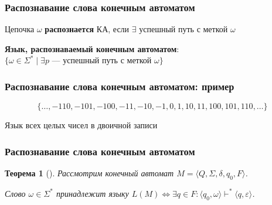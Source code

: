 \documentclass{beamer}
\newtheorem{rutheorem}{Теорема}
\def\iff{\Leftrightarrow}
\begin{document}
\begin{frame}[fragile]
  \transwipe[direction=90]
  \frametitle{Распознавание слова конечным автоматом}

\begin{center}
  Цепочка $\omega$ \textbf{распознается} КА, если $\exists$ успешный путь с меткой $\omega$
\end{center}

\vspace{20pt}

\begin{center}
  \textbf{Язык, распознаваемый конечным автоматом}: \\ $\{ \omega \in \Sigma^* \mid \exists p$ --- успешный путь с меткой $\omega \}$
\end{center}
\end{frame}

\begin{frame}[fragile]
  \transwipe[direction=90]
  \frametitle{Распознавание слова конечным автоматом: пример}

\[ \{ \dots, -110, -101, -100, -11, -10, -1, 0, 1, 10, 11, 100, 101, 110, \dots\} \]

\begin{center}
  Язык всех целых чисел в двоичной записи
\end{center}

  \begin{center}
  \end{center}
\end{frame}


\begin{frame}[fragile]
  \transwipe[direction=90]
  \frametitle{Распознавание слова конечным автоматом}
  \begin{rutheorem}[]
   Рассмотрим конечный автомат  $M = \langle Q , \Sigma , \delta , q_0 , F \rangle$.

   Слово $\omega \in \Sigma ^*$ принадлежит языку $L(M) \iff \exists q \in F: \langle q_0 , \omega \rangle \vdash^* \langle q , \varepsilon \rangle$.
  \end{rutheorem}
\end{frame}
\end{document}
